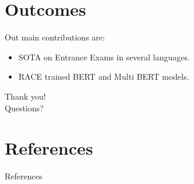 \documentclass[]{beamer}
\begin{document}
\section{Outcomes}
  \begin{frame}{\secname}
    \begin{alertblock}{Out main contributions are:}
      \begin{itemize}
        \item SOTA on Entrance Exams in several languages.
        \item RACE trained BERT and Multi BERT models.
      \end{itemize}
    \end{alertblock}
  \end{frame}


\begin{frame}[standout]
  Thank you!\\
  Questions?
\end{frame}

\section{References}
  \begin{frame}[allowframebreaks]{References}
    \printbibliography%
  \end{frame}
\end{document}
